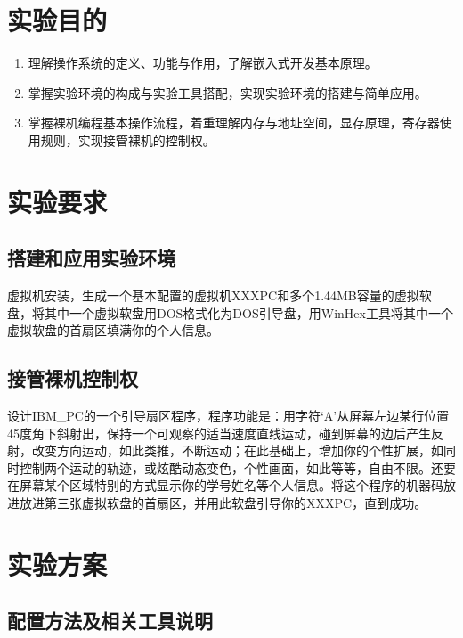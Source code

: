 \documentclass[a4paper,11pt,UTF8]{ctexart}
\begin{document}
\setcounter{tocdepth}{2}
\setlength{\parskip}{0pt}
\tableofcontents
\clearpage

\section{实验目的}
	
	\begin{enumerate}
		\item 理解操作系统的定义、功能与作用，了解嵌入式开发基本原理。
		\item 掌握实验环境的构成与实验工具搭配，实现实验环境的搭建与简单应用。
		\item 掌握裸机编程基本操作流程，着重理解内存与地址空间，显存原理，寄存器使用规则，实现接管裸机的控制权。
	\end{enumerate}


\section{实验要求}

\subsection{搭建和应用实验环境}

	虚拟机安装，生成一个基本配置的虚拟机XXXPC和多个1.44MB容量的虚拟软盘，将其中一个虚拟软盘用DOS格式化为DOS引导盘，用WinHex工具将其中一个虚拟软盘的首扇区填满你的个人信息。
	

\subsection{接管裸机控制权}
	
    设计IBM\_PC的一个引导扇区程序，程序功能是：用字符‘A’从屏幕左边某行位置45度角下斜射出，保持一个可观察的适当速度直线运动，碰到屏幕的边后产生反射，改变方向运动，如此类推，不断运动；在此基础上，增加你的个性扩展，如同时控制两个运动的轨迹，或炫酷动态变色，个性画面，如此等等，自由不限。还要在屏幕某个区域特别的方式显示你的学号姓名等个人信息。将这个程序的机器码放进放进第三张虚拟软盘的首扇区，并用此软盘引导你的XXXPC，直到成功。
	

\section{实验方案}


\subsection{配置方法及相关工具说明}
\end{document}
